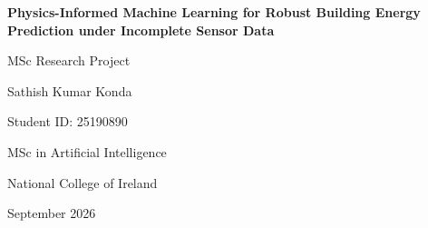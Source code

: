 \documentclass[11pt,a4paper]{article}
\begin{document}
\begin{titlepage}
\centering
\vspace*{2.5cm}
{\LARGE\bfseries Physics-Informed Machine Learning for Robust Building Energy Prediction under Incomplete Sensor Data\par}
\vspace{1.5cm}
{\Large MSc Research Project\par}
\vspace{1.2cm}
{\large Sathish Kumar Konda\par}
\vspace{0.3cm}
Student ID: 25190890\par
\vspace{0.6cm}
MSc in Artificial Intelligence\par
National College of Ireland\par
\vfill
{\large September 2026\par}
\end{titlepage}


\newpage
\tableofcontents
\newpage












\end{document}
